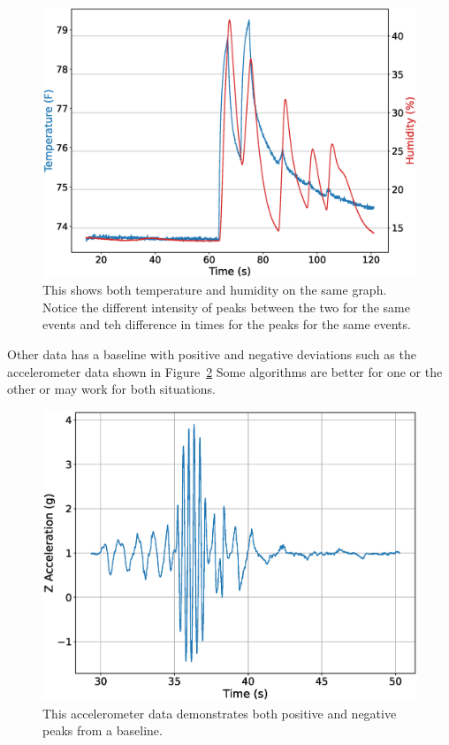 \begin{figure}[!htb]
	\centering
	\includegraphics[scale=0.4]{information/TempHum.eps}
	\caption{This shows both temperature and humidity on the same graph. Notice the different intensity
    of peaks between the two for the same events and teh difference in times for the peaks for the 
    same events.}
	\label{fig:temphumidpeaks}
\end{figure}

Other data has a baseline with positive and negative deviations such as the accelerometer data 
shown in Figure~\ref{fig:accelpeaks} Some algorithms are better for one or the other or may work for both situations.

\begin{figure}[!htb]
	\centering
	\includegraphics[scale=0.4]{information/rawAccel.eps}
	\caption{This accelerometer data demonstrates both positive and negative peaks from a baseline.}
	\label{fig:accelpeaks}
\end{figure}

